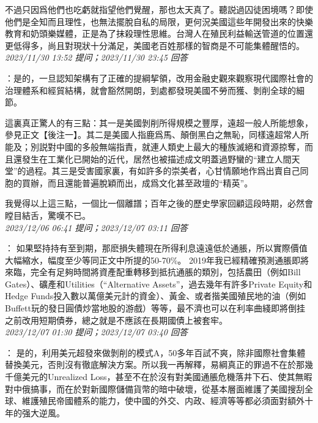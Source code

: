 \documentclass[twocolumn]{ctexart}
\begin{document}
不過只因爲他們也吃虧就指望他們覺醒，那也太天真了。聽説過囚徒困境嗎？即使他們是全知而且理性，也無法擺脫自私的局限，更何況美國這些年開發出來的快樂教育和奶頭樂媒體，正是為了抹殺理性思維。台灣人在殖民利益輸送管道的位置還更低得多，尚且對現狀十分滿足，美國老百姓那樣的智商是不可能集體醒悟的。
\\

\textit{\hfill\noindent\small 2023/11/30 13:52 提问；2023/11/30 23:45 回答}

：是的，一旦認知架構有了正確的提綱挈領，改用金融史觀來觀察現代國際社會的治理體系和經貿結構，就會豁然開朗，到處都發現美國不勞而獲、剝削全球的細節。

這裏真正驚人的有三點：其一是美國剝削所得規模之豐厚，遠超一般人所能想象，參見正文【後注一】。其二是美國人指鹿爲馬、顛倒黑白之無恥，同樣遠超常人所能及；別説對中國的多般無端指責，就連人類史上最大的種族滅絕和資源掠奪，而且還發生在工業化已開始的近代，居然也被描述成文明蓋過野蠻的“建立人間天堂”的過程。其三是受害國家裏，有如許多的崇美者，心甘情願地作爲出賣自己同胞的買辦，而且還能普遍脫穎而出，成爲文化甚至政壇的“精英”。

我覺得以上這三點，一個比一個離譜；百年之後的歷史學家回顧這段時期，必然會瞠目結舌，驚嘆不已。
\\

\textit{\hfill\noindent\small 2023/12/06 06:41 提问；2023/12/07 03:11 回答}

：
如果堅持持有至到期，那麽損失體現在所得利息遠遠低於通脹，所以實際價值大幅縮水，幅度至少等同正文中所提的50-70\%。
2019年我已經精確預測通脹即將來臨，完全有足夠時間將資產配重轉移到抵抗通脹的類別，包括農田（例如Bill Gates）、礦產和Utilities（“Alternative Assets”，過去幾年有許多Private Equity和Hedge Funds投入數以萬億美元計的資金）、黃金、或者揩美國殖民地的油（例如Buffett玩的發日圓債炒當地股的游戲）等等，最不濟也可以在利率曲綫即將倒挂之前改用短期債券，總之就是不應該在長期國債上被套牢。
\\

\textit{\hfill\noindent\small 2023/12/07 01:30 提问；2023/12/07 03:40 回答}

：
是的，利用美元超發來做剝削的模式A，50多年百試不爽，除非國際社會集體替換美元，否則沒有徹底解決方案。所以我一再解釋，易綱真正的罪過不在於那幾千億美元的Unrealized Loss，甚至不在於沒有對美國通脹危機落井下石、使其無暇對中俄搞事，而在於對新國際儲備貨幣的暗中破壞，從基本層面維護了美國搜刮全球、維護殖民帝國體系的能力，使中國的外交、内政、經濟等等都必須面對額外十年的强大逆風。
\\
\end{document}
